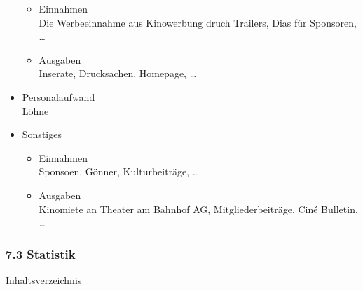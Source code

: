 \documentclass[
]{article}
\providecommand{\tightlist}{%
  \setlength{\itemsep}{0pt}\setlength{\parskip}{0pt}}
\begin{document}
\begin{itemize}
  \begin{itemize}
  \tightlist
  \item
    Einnahmen\\
    Die Werbeeinnahme aus Kinowerbung druch Trailers, Dias für
    Sponsoren, \ldots{}
  \item
    Ausgaben\\
    Inserate, Drucksachen, Homepage, \ldots{}
  \end{itemize}
\item
  Personalaufwand\\
  Löhne
\item
  Sonstiges

  \begin{itemize}
  \tightlist
  \item
    Einnahmen\\
    Sponsoen, Gönner, Kulturbeiträge, \ldots{}
  \item
    Ausgaben\\
    Kinomiete an Theater am Bahnhof AG, Mitgliederbeiträge, Ciné
    Bulletin, \ldots{}
  \end{itemize}
\end{itemize}

\subsubsection{7.3 Statistik}\label{statistik}

\hyperref[Inhaltsverzeichnis]{Inhaltsverzeichnis}
\end{document}
